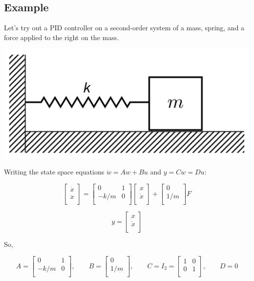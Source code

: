 \documentclass[10pt,letterpaper]{article}
\begin{document}
\subsection*{Example}
Let's try out a PID controller on a second-order system of a mass, spring, and a force applied to the right on the mass.

\begin{center}
\includegraphics[scale=0.2]{spring-mass}
\end{center}

Writing the state space equations $\dot{w} = Aw + Bu$ and $y = Cw = Du$:

\[
\begin{bmatrix}
	\dot{x} \\
	\ddot{x} \\
\end{bmatrix} =
\begin{bmatrix}
	0 & 1 \\
	-k/m & 0 \\
\end{bmatrix}
\begin{bmatrix}
	x \\
	\dot{x} \\
\end{bmatrix} +
\begin{bmatrix}
	0 \\
	1/m \\
\end{bmatrix} F
\]

\[
y =
\begin{bmatrix}
	x \\
	\dot{x} \\
\end{bmatrix}
\]

So,

\[
A = \begin{bmatrix}
	0 & 1 \\
	-k/m & 0 \\
\end{bmatrix}, \qquad
B = \begin{bmatrix}
	0 \\
	1/m \\
\end{bmatrix}, \qquad
C = I_2 = \begin{bmatrix}
	1 & 0 \\
	0 & 1 \\
\end{bmatrix}, \qquad
D = 0
\]
\end{document}
